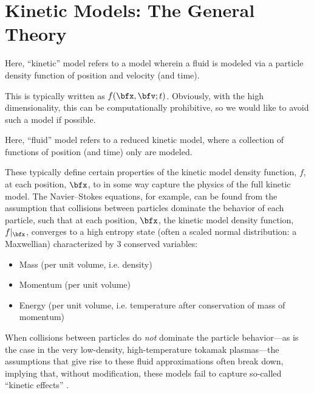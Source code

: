 \section{Kinetic Models: The General Theory}
    
    \begin{definition}
        Here, ``kinetic'' model refers to a model wherein a fluid is modeled via a particle density function of position and velocity (and time).
    \end{definition}
    
    This is typically written as $f(\bfx, \bfv; t)$. Obviously, with the high dimensionality, this can be computationally prohibitive, so we would like to avoid such a model if possible.
    
    
    \begin{definition}
        Here, ``fluid'' model refers to a reduced kinetic model, where a collection of functions of position (and time) only are modeled.
    \end{definition}
    
    These typically define certain properties of the kinetic model density function, $f$, at each position, $\bfx$, to in some way capture the physics of the full kinetic model. The Navier--Stokes equations, for example, can be found from the assumption that collisions between particles dominate the behavior of each particle, such that at each position, $\bfx$, the kinetic model density function, $f|_{\bfx}$, converges to a high entropy state (often a scaled normal distribution: a Maxwellian) characterized by 3 conserved variables:
    \begin{itemize}
        \item  Mass (per unit volume, i.e. density)
        \item  Momentum (per unit volume)
        \item  Energy (per unit volume, i.e. temperature after conservation of mass of momentum)
    \end{itemize}
    When collisions between particles do \emph{not} dominate the particle behavior---as is the case in the very low-density, high-temperature  tokamak plasmas---the assumptions that give rise to these fluid approximations often break down, implying that, without modification, these models fail to capture so-called ``kinetic effects'' .
    

